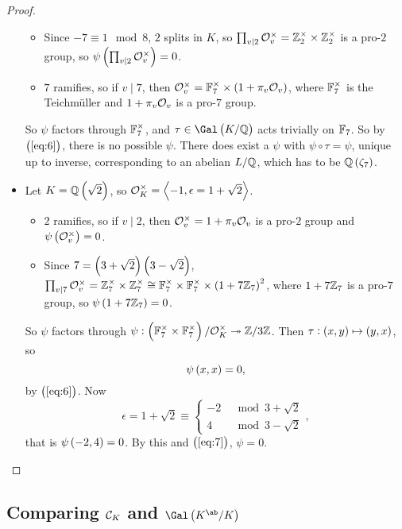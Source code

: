 \begin{proof}
\begin{itemize}
\begin{itemize}
\item Since $ -7 \equiv 1 \mod 8 $, $ 2 $ splits in $ K $, so $ \prod_{v \mid 2} \mathcal{O}_v^\times = \mathbb{Z}_2^\times \times \mathbb{Z}_2^\times $ is a pro-$ 2 $ group, so $ \psi\br{\prod_{v \mid 2} \OOO_v^\times} = 0 $.
\item $ 7 $ ramifies, so if $ v \mid 7 $, then $ \OOO_v^\times = \FF_7^\times \times \br{1 + \pi_v\OOO_v} $, where $ \mathbb{F}_7^\times $ is the Teichm\"uller and $ 1 + \pi_v\mathcal{O}_v $ is a pro-$ 7 $ group.
\end{itemize}
So $ \psi $ factors through $ \mathbb{F}_7^\times $, and $ \tau \in \Gal\br{K / \QQ} $ acts trivially on $ \mathbb{F}_7 $. So by $ \br{\ref{eq:6}} $, there is no possible $ \psi $. There does exist a $ \psi $ with $ \psi \circ \tau = \psi $, unique up to inverse, corresponding to an abelian $ L / \mathbb{Q} $, which has to be $ \QQ\br{\zeta_7} $.
\item Let $ K = \QQ\br{\sqrt{2}} $, so $ \mathcal{O}_K^\times = \left\langle -1, \epsilon = 1 + \sqrt{2} \right\rangle $.
\begin{itemize}
\item $ 2 $ ramifies, so if $ v \mid 2 $, then $ \mathcal{O}_v^\times = 1 + \pi_v\mathcal{O}_v $ is a pro-$ 2 $ group and $ \psi\br{\OOO_v^\times} = 0 $.
\item Since $ 7 = \br{3 + \sqrt{2}}\br{3 - \sqrt{2}} $, $ \prod_{v \mid 7} \OOO_v^\times = \ZZ_7^\times \times \ZZ_7^\times \cong \FF_7^\times \times \FF_7^\times \times \br{1 + 7\ZZ_7}^2 $, where $ 1 + 7\mathbb{Z}_7 $ is a pro-$ 7 $ group, so $ \psi\br{1 + 7\ZZ_7} = 0 $.
\end{itemize}
So $ \psi $ factors through $ \psi : \br{\FF_7^\times \times \FF_7^\times} / \OOO_K^\times \twoheadrightarrow \ZZ / 3\ZZ $. Then $ \tau : \br{x, y} \mapsto \br{y, x} $, so
\begin{equation}
\label{eq:7}
\psi\br{x, x} = 0,
\end{equation}
by $ \br{\ref{eq:6}} $. Now
$$ \epsilon = 1 + \sqrt{2} \equiv
\begin{cases}
-2 & \mod 3 + \sqrt{2} \\
4 & \mod 3 - \sqrt{2}
\end{cases},
$$
that is $ \psi\br{-2, 4} = 0 $. By this and $ \br{\ref{eq:7}} $, $ \psi = 0 $.
\end{itemize}
\end{proof}

\pagebreak

\subsection{Comparing \texorpdfstring{$ \mathcal{C}_K $}{idele class group} and \texorpdfstring{$ \Gal\br{K^{\ab} / K} $}{Galois group of maximal abelian extension}}

